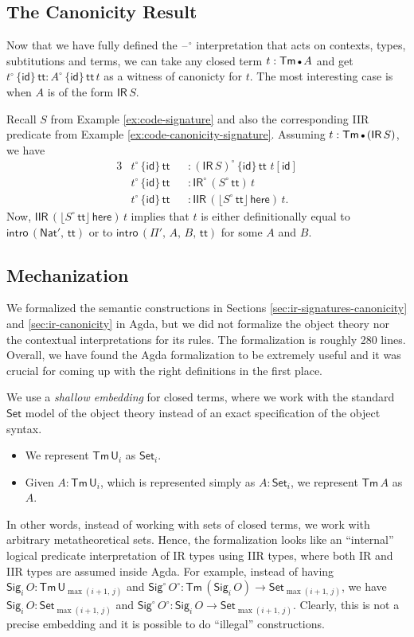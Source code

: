 \documentclass[acmsmall,screen,review]{acmart}
\newcommand{\msf}[1]{{\mathsf{#1}}}
\newcommand{\U}{\msf{U}}
\newcommand{\Set}{\msf{Set}}
\newcommand{\Nat}{\msf{Nat}}
\newcommand{\Sig}{\msf{Sig}}
\newcommand{\ttt}{\msf{tt}}
\newcommand{\blank}{{\mathord{\hspace{1pt}\text{--}\hspace{1pt}}}}
\newcommand{\IR}{\msf{IR}}
\newcommand{\intro}{\msf{intro}}
\newcommand{\IIR}{\msf{IIR}}
\newcommand{\floord}[1]{\lfloor #1 \rfloor}
\newcommand{\emptycon}{\scaleobj{.75}\bullet}
\newcommand{\id}{\msf{id}}
\newcommand{\Tm}{\msf{Tm}}
\newcommand{\w}{\circ}
\newcommand{\here}{\msf{here}}
\begin{document}
\subsection{The Canonicity Result}

Now that we have fully defined the $\blank^\w$ interpretation that acts on contexts, types,
subtitutions and terms, we can take any closed term $t : \Tm\,\emptycon\,A$ and get
$t^\w\,\{\id\}\,\ttt : A^\w\,\{\id\}\,\ttt\,t$ as a witness of canonicty for $t$. The most
interesting case is when $A$ is of the form $\IR\,S$.
\begin{example}
Recall $S$ from Example \ref{ex:code-signature} and
also the corresponding IIR predicate from Example \ref{ex:code-canonicity-signature}. Assuming $t :
\Tm\,\emptycon\,(\IR\,S)$, we have
\begin{alignat*}{3}
  &t^\w\,\{\id\}\,\ttt &&: (\IR\,S)^\w\,\{\id\}\,\ttt\,\,t[\id]\\
  &t^\w\,\{\id\}\,\ttt &&: \IR^\w\,(S^\w\,\ttt)\,t\\
  &t^\w\,\{\id\}\,\ttt &&: \IIR\,(\floord{S^\w\,\ttt}\,\here)\,t.
\end{alignat*}
Now, $\IIR\,(\floord{S^\w\,\ttt}\,\here)\,t$ implies that $t$ is either definitionally equal to $\intro\,(\Nat',\,\ttt)$
or to $\intro\,(\Pi',\,A,\,B,\,\ttt)$ for some $A$ and $B$.
\end{example}

\subsection{Mechanization}\label{sec:canonicity-mechanization}

We formalized the semantic constructions in Sections \ref{sec:ir-signatures-canonicity} and
\ref{sec:ir-canonicity} in Agda, but we did not formalize the object theory nor the contextual
interpretations for its rules. The formalization is roughly 280 lines. Overall, we have found the
Agda formalization to be extremely useful and it was crucial for coming up with the right
definitions in the first place.

We use a \emph{shallow embedding} for closed terms, where we work with the standard $\Set$ model of
the object theory instead of an exact specification of the object syntax.
\begin{itemize}
\item We represent $\Tm\,\U_i$ as $\Set_i$.
\item Given $A : \Tm\,\U_i$, which is represented simply as $A : \Set_i$, we represent $\Tm\,A$ as $A$.
\end{itemize}
In other words, instead of working with sets of closed terms, we work with arbitrary metatheoretical
sets. Hence, the formalization looks like an ``internal'' logical predicate interpretation of IR
types using IIR types, where both IR and IIR types are assumed inside Agda. For example, instead of
having $\Sig_i\,O : \Tm\,\U_{\max(i+1,\,j)}$ and $\Sig^\w\,O^\w : \Tm\,(\Sig_i\,O) \to
\Set_{\max(i+1,\,j)}$, we have $\Sig_i\,O : \Set_{\max(i+1,\,j)}$ and $\Sig^\w\,O^\w : \Sig_i\,O \to
\Set_{\max(i+1,\,j)}$. Clearly, this is not a precise embedding and it is possible to do ``illegal''
constructions.
\end{document}
